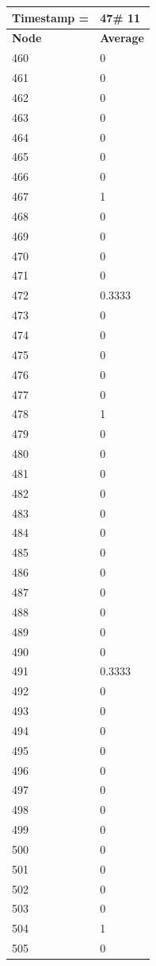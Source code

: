 \begin{tabular}{|l||l|}
\hline
\textbf{Timestamp =} & \textbf{47}\# 11\\\hline
	\textbf{Node} & \textbf{Average} \\ \hline
\hline
	460 & 0 \\ \hline
	461 & 0 \\ \hline
	462 & 0 \\ \hline
	463 & 0 \\ \hline
	464 & 0 \\ \hline
	465 & 0 \\ \hline
	466 & 0 \\ \hline
	467 & 1 \\ \hline
	468 & 0 \\ \hline
	469 & 0 \\ \hline
	470 & 0 \\ \hline
	471 & 0 \\ \hline
	472 & 0.3333 \\ \hline
	473 & 0 \\ \hline
	474 & 0 \\ \hline
	475 & 0 \\ \hline
	476 & 0 \\ \hline
	477 & 0 \\ \hline
	478 & 1 \\ \hline
	479 & 0 \\ \hline
	480 & 0 \\ \hline
	481 & 0 \\ \hline
	482 & 0 \\ \hline
	483 & 0 \\ \hline
	484 & 0 \\ \hline
	485 & 0 \\ \hline
	486 & 0 \\ \hline
	487 & 0 \\ \hline
	488 & 0 \\ \hline
	489 & 0 \\ \hline
	490 & 0 \\ \hline
	491 & 0.3333 \\ \hline
	492 & 0 \\ \hline
	493 & 0 \\ \hline
	494 & 0 \\ \hline
	495 & 0 \\ \hline
	496 & 0 \\ \hline
	497 & 0 \\ \hline
	498 & 0 \\ \hline
	499 & 0 \\ \hline
	500 & 0 \\ \hline
	501 & 0 \\ \hline
	502 & 0 \\ \hline
	503 & 0 \\ \hline
	504 & 1 \\ \hline
	505 & 0 \\ \hline
\end{tabular}
